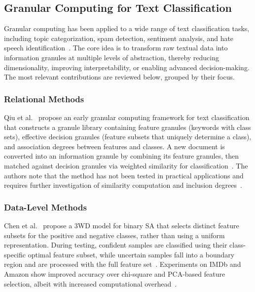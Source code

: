\documentclass[a4paper,twoside,12pt]{book}
\begin{document}
\subsection{Granular Computing for Text Classification}

Granular computing has been applied to a wide range of text classification tasks, including topic categorization, spam detection, sentiment analysis, and hate speech identification~\cite{Behzadidoost2024GrC, Liu2017fuzzy, Yang2022temporal}. The core idea is to transform raw textual data into information granules at multiple levels of abstraction, thereby reducing dimensionality, improving interpretability, or enabling advanced decision-making. The most relevant contributions are reviewed below, grouped by their focus.

\subsubsection{Relational Methods}

Qiu et al.~\cite{qui2006GrC} propose an early granular computing framework for text classification that constructs a granule library containing feature granules (keywords with class sets), effective decision granules (feature subsets that uniquely determine a class), and association degrees between features and classes. A new document is converted into an information granule by combining its feature granules, then matched against decision granules via weighted similarity for classification~\cite{qui2006GrC}. The authors note that the method has not been tested in practical applications and requires further investigation of similarity computation and inclusion degrees~\cite{qui2006GrC}.

\subsubsection{Data-Level Methods}

Chen et al.~\cite{Chen2022threeway} propose a 3WD model for binary SA that selects distinct feature subsets for the positive and negative classes, rather than using a uniform representation. During testing, confident samples are classified using their class-specific optimal feature subset, while uncertain samples fall into a boundary region and are processed with the full feature set~\cite{Chen2022threeway}. Experiments on IMDb and Amazon show improved accuracy over chi-square and PCA-based feature selection, albeit with increased computational overhead~\cite{Chen2022threeway}.
\end{document}
